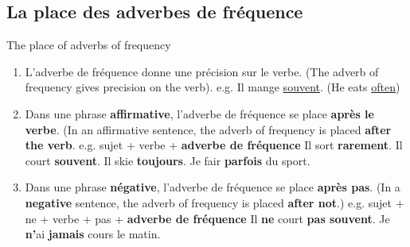 \documentclass[10pt,a4paper,twoside]{article} %
\begin{document}
\subsection*{La place des adverbes de fréquence}
\begin{center}
    The place of adverbs of frequency
\end{center}
\begin{enumerate}
    \item L'adverbe de fréquence donne une précision sur le verbe. (The adverb of frequency gives precision on the verb). \newline
    e.g. Il mange \underline{souvent}. (He eats \underline{often})
    \item Dans une phrase \textbf{affirmative}, l'adverbe de fréquence se place \textbf{après le verbe}. (In an affirmative sentence, the adverb of frequency is placed \textbf{after the verb}. \newline
    e.g. sujet + verbe + \textbf{adverbe de fréquence} \newline
    Il sort \textbf{rarement}. Il court \textbf{souvent}. Il skie \textbf{toujours}. Je fair \textbf{parfois} du sport.
    \item Dans une phrase \textbf{négative}, l'adverbe de fréquence se place \textbf{après pas}. (In a \textbf{negative} sentence, the adverb of frequency is placed \textbf{after not}.) \newline
    e.g. sujet + ne + verbe + pas + \textbf{adverbe de fréquence} \newline
    Il \textbf{ne} court \textbf{pas souvent}. Je \textbf{n'}ai \textbf{jamais} cours le matin.
\end{enumerate}

\end{document}
